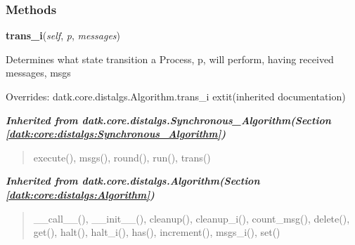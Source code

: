 
  \subsubsection{Methods}

    \vspace{0.5ex}

\hspace{.8\funcindent}\begin{boxedminipage}{\funcwidth}

    \raggedright \textbf{trans\_i}(\textit{self}, \textit{p}, \textit{messages})

\setlength{\parskip}{2ex}
    Determines what state transition a Process, p, will perform, having 
    received messages, msgs

\setlength{\parskip}{1ex}
      Overrides: datk.core.distalgs.Algorithm.trans\_i 	extit{(inherited documentation)}

    \end{boxedminipage}


\large{\textbf{\textit{Inherited from datk.core.distalgs.Synchronous\_Algorithm\textit{(Section \ref{datk:core:distalgs:Synchronous_Algorithm})}}}}

\begin{quote}
execute(), msgs(), round(), run(), trans()
\end{quote}

\large{\textbf{\textit{Inherited from datk.core.distalgs.Algorithm\textit{(Section \ref{datk:core:distalgs:Algorithm})}}}}

\begin{quote}
\_\_call\_\_(), \_\_init\_\_(), cleanup(), cleanup\_i(), count\_msg(), delete(), get(), halt(), halt\_i(), has(), increment(), msgs\_i(), set()
\end{quote}



